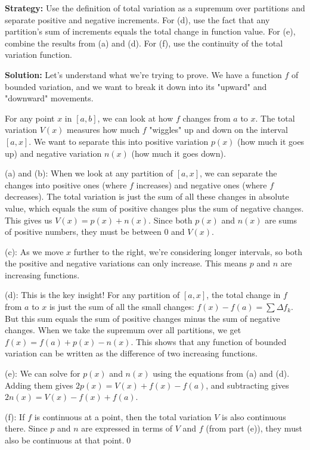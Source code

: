 \noindent\textbf{Strategy:} Use the definition of total variation as a supremum over partitions and separate positive and negative increments. For (d), use the fact that any partition's sum of increments equals the total change in function value. For (e), combine the results from (a) and (d). For (f), use the continuity of the total variation function.

\bigskip\noindent\textbf{Solution:}
Let's understand what we're trying to prove. We have a function $f$ of bounded variation, and we want to break it down into its "upward" and "downward" movements.

For any point $x$ in $[a,b]$, we can look at how $f$ changes from $a$ to $x$. The total variation $V(x)$ measures how much $f$ "wiggles" up and down on the interval $[a,x]$. We want to separate this into positive variation $p(x)$ (how much it goes up) and negative variation $n(x)$ (how much it goes down).

(a) and (b): When we look at any partition of $[a,x]$, we can separate the changes into positive ones (where $f$ increases) and negative ones (where $f$ decreases). The total variation is just the sum of all these changes in absolute value, which equals the sum of positive changes plus the sum of negative changes. This gives us $V(x) = p(x) + n(x)$. Since both $p(x)$ and $n(x)$ are sums of positive numbers, they must be between $0$ and $V(x)$.

(c): As we move $x$ further to the right, we're considering longer intervals, so both the positive and negative variations can only increase. This means $p$ and $n$ are increasing functions.

(d): This is the key insight! For any partition of $[a,x]$, the total change in $f$ from $a$ to $x$ is just the sum of all the small changes: $f(x) - f(a) = \sum \Delta f_k$. But this sum equals the sum of positive changes minus the sum of negative changes. When we take the supremum over all partitions, we get $f(x) = f(a) + p(x) - n(x)$. This shows that any function of bounded variation can be written as the difference of two increasing functions.

(e): We can solve for $p(x)$ and $n(x)$ using the equations from (a) and (d). Adding them gives $2p(x) = V(x) + f(x) - f(a)$, and subtracting gives $2n(x) = V(x) - f(x) + f(a)$.

(f): If $f$ is continuous at a point, then the total variation $V$ is also continuous there. Since $p$ and $n$ are expressed in terms of $V$ and $f$ (from part (e)), they must also be continuous at that point.\qed

